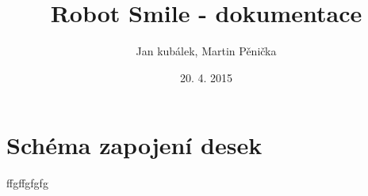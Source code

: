\documentclass[a4paper, 12pt]{report}
\title{Robot Smile - dokumentace}
\author{Jan kubálek, Martin Pěnička}
\date{20. 4. 2015}
\begin{document}
\maketitle

\tableofcontents \newpage

\chapter{Schéma zapojení desek}

ffgffgfgfg




\end{document}
